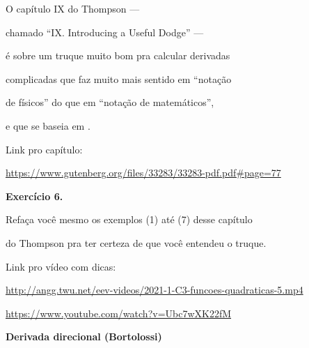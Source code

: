 \documentclass[oneside,12pt]{article}
\begin{document}
\ssk

O capítulo IX do Thompson ---

chamado ``IX. Introducing a Useful Dodge'' ---

é sobre um truque muito bom pra calcular derivadas

complicadas que faz muito mais sentido em ``notação

de físicos'' do que em ``notação de matemáticos'',

e que se baseia em .

\msk

Link pro capítulo:

\ssk

{\footnotesize

\url{https://www.gutenberg.org/files/33283/33283-pdf.pdf#page=77}

}


\newpage


{\bf Exercício 6.}

Refaça você mesmo os exemplos (1) até (7) desse capítulo

do Thompson pra ter certeza de que você entendeu o truque.

\msk

Link pro vídeo com dicas:

\ssk

{\footnotesize

\url{http://angg.twu.net/eev-videos/2021-1-C3-funcoes-quadraticas-5.mp4}

\url{https://www.youtube.com/watch?v=Ubc7wXK22fM}

}


\newpage


{\bf Derivada direcional (Bortolossi)}

\end{document}

